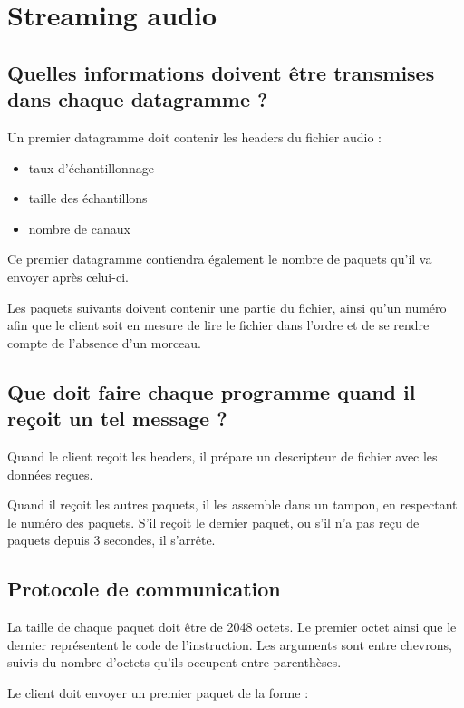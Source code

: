 \documentclass[a4paper,10pt,openany,oneside]{report}
\begin{document}
\section{Streaming audio}

\subsection{Quelles informations doivent être transmises dans chaque
            datagramme ?}

Un premier datagramme doit contenir les headers du fichier audio :

\begin{itemize}
    \item taux d'échantillonnage
    \item taille des échantillons
    \item nombre de canaux
\end{itemize}

Ce premier datagramme contiendra également le nombre de paquets qu'il va
envoyer après celui-ci.

Les paquets suivants doivent contenir une partie du fichier, ainsi qu'un numéro
afin que le client soit en mesure de lire le fichier dans l'ordre et de se
rendre compte de l'absence d'un morceau.

\subsection{Que doit faire chaque programme quand il reçoit un tel message ?}

Quand le client reçoit les headers, il prépare un descripteur de fichier avec
les données reçues.

Quand il reçoit les autres paquets, il les assemble dans un tampon, en
respectant le numéro des paquets. S'il reçoit le dernier paquet, ou s'il n'a
pas reçu de paquets depuis 3 secondes, il s'arrête.

\subsection{Protocole de communication}

La taille de chaque paquet doit être de 2048 octets. Le premier octet ainsi que
le dernier représentent le code de l'instruction. Les arguments sont entre
chevrons, suivis du nombre d'octets qu'ils occupent entre parenthèses.

Le client doit envoyer un premier paquet de la forme :
\end{document}

